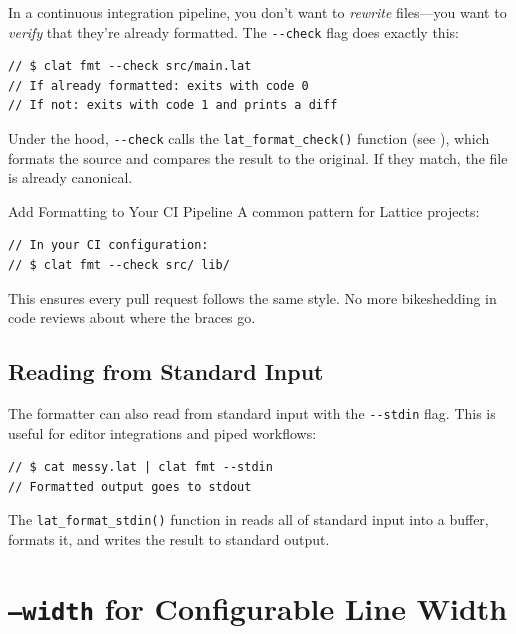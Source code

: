 In a continuous integration pipeline, you don't want to \emph{rewrite} files---you want to \emph{verify} that they're already formatted. The \lstinline|--check| flag does exactly this:

\begin{lstlisting}[language=Lattice, caption={Using {-}{-}check in CI}]
// $ clat fmt --check src/main.lat
// If already formatted: exits with code 0
// If not: exits with code 1 and prints a diff
\end{lstlisting}

Under the hood, \lstinline|--check| calls the \lstinline|lat_format_check()| function (see ), which formats the source and compares the result to the original. If they match, the file is already canonical.

\begin{tipbox}{Add Formatting to Your CI Pipeline}
A common pattern for Lattice projects:
\begin{lstlisting}[language=Lattice]
// In your CI configuration:
// $ clat fmt --check src/ lib/
\end{lstlisting}
This ensures every pull request follows the same style. No more bikeshedding in code reviews about where the braces go.
\end{tipbox}

\subsection{Reading from Standard Input}\label{sec:fmt-stdin}

The formatter can also read from standard input with the \lstinline|--stdin| flag.
This is useful for editor integrations and piped workflows:

\begin{lstlisting}[language=Lattice, caption={Formatting via stdin}]
// $ cat messy.lat | clat fmt --stdin
// Formatted output goes to stdout
\end{lstlisting}

The \lstinline|lat_format_stdin()| function in  reads all of standard input into a buffer, formats it, and writes the result to standard output.

\section{\texttt{--width} for Configurable Line Width}\label{sec:fmt-width}

